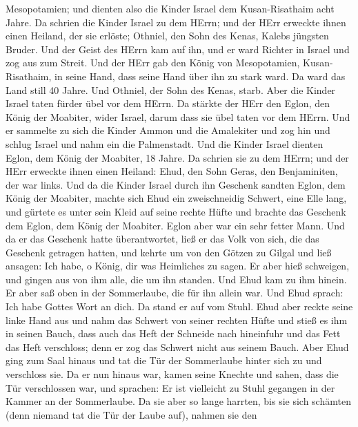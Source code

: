 Mesopotamien; und dienten also die Kinder Israel dem Kusan-Risathaim
acht Jahre.  Da schrien die Kinder Israel zu dem HErrn; und
der HErr erweckte ihnen einen Heiland, der sie erlöste; Othniel, den
Sohn des Kenas, Kalebs jüngsten Bruder.  Und der Geist des
HErrn kam auf ihn, und er ward Richter in Israel und zog aus zum Streit.
Und der HErr gab den König von Mesopotamien, Kusan-Risathaim, in seine
Hand, dass seine Hand über ihn zu stark ward.  Da ward das
Land still 40 Jahre. Und Othniel, der Sohn des Kenas, starb.
 Aber die Kinder Israel taten fürder übel vor dem HErrn. Da
stärkte der HErr den Eglon, den König der Moabiter, wider Israel, darum
dass sie übel taten vor dem HErrn.  Und er sammelte zu sich
die Kinder Ammon und die Amalekiter und zog hin und schlug Israel und
nahm ein die Palmenstadt.  Und die Kinder Israel dienten
Eglon, dem König der Moabiter, 18 Jahre.  Da schrien sie zu
dem HErrn; und der HErr erweckte ihnen einen Heiland: Ehud, den Sohn
Geras, den Benjaminiten, der war links. Und da die Kinder Israel durch
ihn Geschenk sandten Eglon, dem König der Moabiter,  machte
sich Ehud ein zweischneidig Schwert, eine Elle lang, und gürtete es
unter sein Kleid auf seine rechte Hüfte  und brachte das
Geschenk dem Eglon, dem König der Moabiter. Eglon aber war ein sehr
fetter Mann.  Und da er das Geschenk hatte überantwortet,
ließ er das Volk von sich, die das Geschenk getragen hatten,
 und kehrte um von den Götzen zu Gilgal und ließ ansagen:
Ich habe, o König, dir was Heimliches zu sagen. Er aber hieß schweigen,
und gingen aus von ihm alle, die um ihn standen.  Und Ehud
kam zu ihm hinein. Er aber saß oben in der Sommerlaube, die für ihn
allein war. Und Ehud sprach: Ich habe Gottes Wort an dich. Da stand er
auf vom Stuhl.  Ehud aber reckte seine linke Hand aus und
nahm das Schwert von seiner rechten Hüfte und stieß es ihm in seinen
Bauch,  dass auch das Heft der Schneide nach hineinfuhr und
das Fett das Heft verschloss; denn er zog das Schwert nicht aus seinem
Bauch.  Aber Ehud ging zum Saal hinaus und tat die Tür der
Sommerlaube hinter sich zu und verschloss sie.  Da er nun
hinaus war, kamen seine Knechte und sahen, dass die Tür verschlossen
war, und sprachen: Er ist vielleicht zu Stuhl gegangen in der Kammer an
der Sommerlaube.  Da sie aber so lange harrten, bis sie
sich schämten (denn niemand tat die Tür der Laube auf), nahmen sie den
